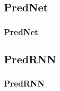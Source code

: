  \subsection{PredNet}
  \begin{frame}
   \frametitle{PredNet}
   
  \end{frame}
  
 \subsection{PredRNN}
  \begin{frame}
   \frametitle{PredRNN}  
  
  \end{frame}
